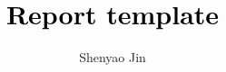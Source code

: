 \documentclass[journal, onecolumn]{IEEEtran}
\begin{document}
\title{\textcolor{black}{Report template}}      

\author{Shenyao Jin} 


\maketitle


\end{document}
